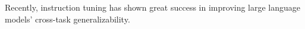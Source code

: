 

Recently, instruction tuning has shown great success in improving large language models' cross-task generalizability.
